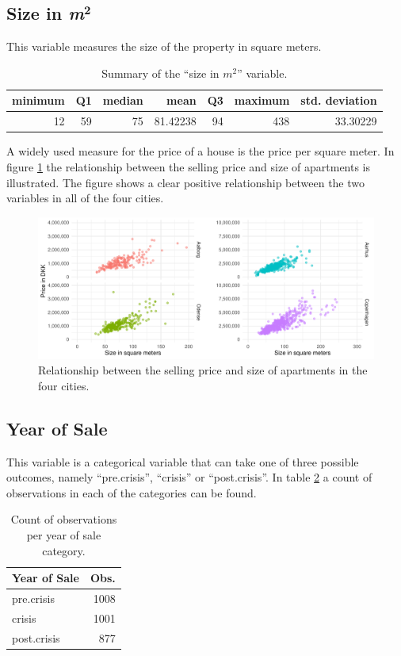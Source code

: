 \subsection*{Size in \textit{m}$\mathbf{^2}$}
This variable measures the size of the property in square meters.
\begin{table}[H]
    \centering
    \begin{tabular}{rrrrrrr}
        \toprule
        \textbf{minimum} & \textbf{Q1} & \textbf{median} & \textbf{mean} & \textbf{Q3} & \textbf{maximum} & \textbf{std. deviation}\\
        \midrule
        12 & 59 & 75 & 81.42238 & 94 & 438 & 33.30229\\
        \bottomrule
    \end{tabular}
    \caption{Summary of the ``size in $m^2$'' variable.}
    \label{tbl:size_in_m2}
\end{table}
A widely used measure for the price of a house is the price per square meter.
In figure \ref{fig:price_per_square_meter} the relationship between the selling price and size of apartments is illustrated.
The figure shows a clear positive relationship between the two variables in all of the four cities.
\begin{figure}[H]
    \centering
    \includegraphics[width=\textwidth]{figures/Data_introduction/price_per_square_meter.pdf}
    \caption{Relationship between the selling price and size of apartments in the four cities.}
    \label{fig:price_per_square_meter}
\end{figure}

\subsection*{Year of Sale}
This variable is a categorical variable that can take one of three possible outcomes, namely ``pre.crisis'', ``crisis'' or ``post.crisis''.
In table \ref{tbl:year_of_sale} a count of observations in each of the categories can be found.
\begin{table}[H]
    \centering
    \begin{tabular}{lr}
        \toprule
        \textbf{Year of Sale} & \textbf{Obs.}\\
        \midrule
        pre.crisis & 1008\\
        crisis & 1001\\
        post.crisis & 877\\
        \bottomrule
    \end{tabular}
    \caption{Count of observations per year of sale category.}
    \label{tbl:year_of_sale}
\end{table}

